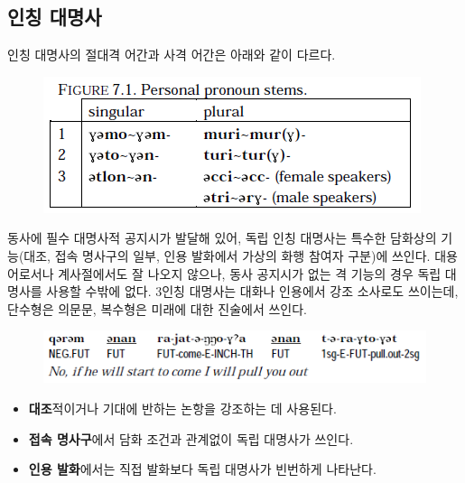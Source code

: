 \subsection{인칭 대명사}
인칭 대명사의 절대격 어간과 사격 어간은 아래와 같이 다르다.
\begin{figure}[H]
\centerline{\includegraphics{Chukchi/src/chpp.png}}
\end{figure}
동사에 필수 대명사적 공지시가 발달해 있어, 독립 인칭 대명사는 특수한 담화상의 기능(대조, 접속 명사구의 일부, 인용 발화에서 가상의 화행 참여자 구분)에 쓰인다. 대용어로서나 계사절에서도 잘 나오지 않으나, 동사 공지시가 없는 격 기능의 경우 독립 대명사를 사용할 수밖에 없다. 3인칭 대명사는 대화나 인용에서 강조 소사로도 쓰이는데, 단수형은 의문문, 복수형은 미래에 대한 진술에서 쓰인다.
\begin{figure}[H]
\centerline{\includegraphics{Chukchi/src/chfu.png}}
\end{figure}
\begin{itemize}
	\item \textbf{대조}적이거나 기대에 반하는 논항을 강조하는 데 사용된다. 
	\item \textbf{접속 명사구}에서 담화 조건과 관계없이 독립 대명사가 쓰인다.
	\item \textbf{인용 발화}에서는 직접 발화보다 독립 대명사가 빈번하게 나타난다.
\end{itemize}
